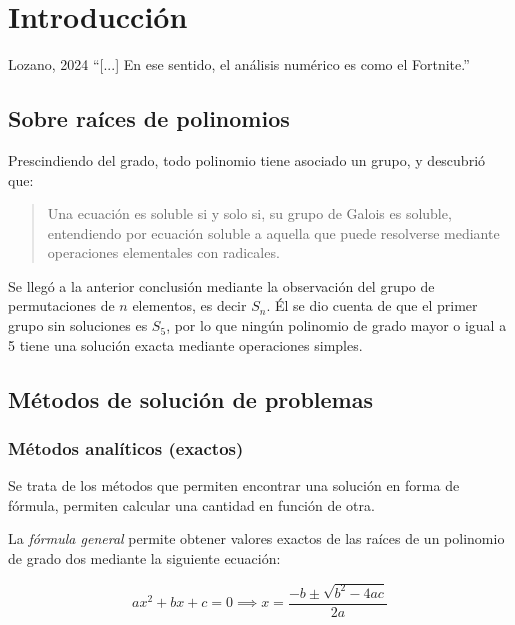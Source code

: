 \chapter{Introducción}

\begin{chapquote}{Lozano, 2024}
    ``[...] En ese sentido, el análisis numérico es como el Fortnite.''
\end{chapquote}


\section{Sobre raíces de polinomios}

Prescindiendo del grado, todo polinomio tiene asociado un grupo, y
descubrió que:

\begin{quote}
    Una ecuación es soluble si y solo si, su grupo de Galois es soluble,
    entendiendo por ecuación soluble a aquella que puede resolverse mediante
    operaciones elementales con radicales.
\end{quote}

Se llegó a la anterior conclusión mediante la observación del grupo de
permutaciones de \(n\) elementos, es decir \(S_n\). Él se dio cuenta de que el
primer grupo sin soluciones es \(S_5\), por lo que ningún polinomio de grado
mayor o igual a 5 tiene una solución exacta mediante operaciones simples.

\section{Métodos de solución de problemas}

\subsection{Métodos analíticos (exactos)}

Se trata de los métodos que permiten encontrar una solución en forma de
fórmula, permiten calcular una cantidad en función de otra.

\begin{eg}
    
    La \emph{fórmula general} permite obtener valores exactos de las raíces de
    un polinomio de grado dos mediante la siguiente ecuación:

    \[
        ax^2 + bx + c = 0 \implies x = \frac{-b \pm \sqrt{b^2 -4ac}}{2a}
    \]
\end{eg}

